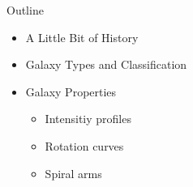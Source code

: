 \documentclass[letterpaper,landscape]{slides}
\begin{document}

\begin{slide}
\begin{center}
{\large \color{red} 
                         Outline
}
\end{center}

\begin{itemize}
\item {\color{blue} A Little Bit of History}
\item {\color{blue} Galaxy Types and Classification}
\item {\color{blue} Galaxy Properties}
\begin{itemize}
\item Intensitiy profiles
\item Rotation curves 
\item Spiral arms 
\end{itemize}          
\end{itemize}          

\vfill
\end{slide}


\end{document}
